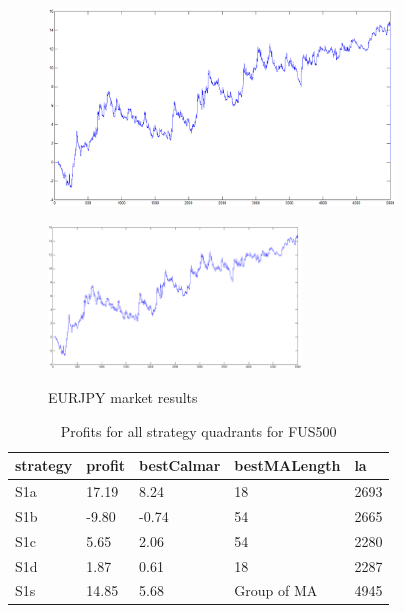 \documentclass{tewiart}
\begin{document}
\begin{figure}[h]
\begin{minipage}{.49\linewidth}
\end{minipage}
\begin{minipage}{.49\linewidth}
\centering
\includegraphics[width=0.82\textwidth]{images/eurjpyD.eps}
\label{mansard}
\end{minipage}
\begin{minipage}{\linewidth}
\centering
\includegraphics[width=0.6\textwidth]{images/eurjpyS.eps}
\label{mansard}
\end{minipage}
\caption{EURJPY market results}
\end{figure}
\FloatBarrier
\newpage
\begin{table}[!t]
\caption{Profits for all strategy quadrants for FUS500}
 \begin{center}
 \begin{tabular}{|l|l|l|l|l|}
 \hline \textbf{strategy} & \textbf{profit} & \textbf{bestCalmar} & \textbf{bestMALength} & \textbf{la} \\ \hline
S1a & 17.19 & 8.24 & 18 & 2693\\ \hline
S1b & -9.80 & -0.74 & 54 & 2665\\ \hline
S1c & 5.65 & 2.06 & 54 & 2280\\ \hline
S1d & 1.87 & 0.61 & 18 & 2287\\ \hline
S1s & 14.85 & 5.68 & Group of MA & 4945\\
\hline \end{tabular}
 \end{center}
 \end{table}
\end{document}
